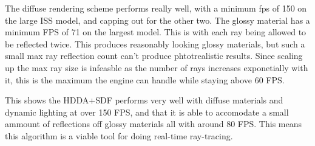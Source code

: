 The diffuse rendering scheme performs really well, with a minimum \acrshort{fps} of 150 on the large ISS model, and capping out for the other two. The glossy material has a minimum FPS of 71 on the largest model. This is with each ray being allowed to be reflected twice. This produces reasonably looking glossy materials, but such a small max ray reflection count can't produce phtotrealistic results. Since scaling up the max ray size is infeasble as the number of rays increases exponetially with it, this is the maximum the engine can handle while staying above 60 FPS.

This shows the HDDA+SDF performs very well with diffuse materials and dynamic lighting at over 150 FPS, and that it is able to accomodate a small ammount of reflections off glossy materials all with around 80 FPS. This means this algorithm is a viable tool for doing real-time ray-tracing.
